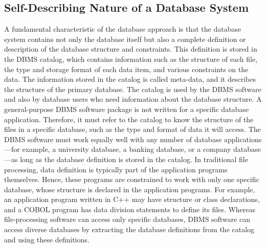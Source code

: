 \subsection{Self-Describing Nature of a Database System}
A fundamental characteristic of the database approach is that the database system contains not only the database itself but also a complete definition or description of the database structure and constraints. This definition is stored in the DBMS catalog, which contains information such as the structure of each file, the type and storage format of each data item, and various constraints on the data. The information stored in the catalog is called meta-data, and it describes the structure of the primary database. The catalog is used by the DBMS software and also by database users who need information about the database structure. A general-purpose DBMS software package is not written for a specific database application. Therefore, it must refer to the catalog to know the structure of the files in a specific database, such as the type and format of data it will access. The DBMS software must work equally well with any number of database applications—for example, a university database, a banking database, or a company database—as long as the database definition is stored in the catalog. In traditional file processing, data definition is typically part of the application programs themselves. Hence, these programs are constrained to work with only one specific database, whose structure is declared in the application programs. For example, an application program written in C++ may have structure or class declarations, and a COBOL program has data division statements to define its files. Whereas file-processing software can access only specific databases, DBMS software can access diverse databases by extracting the database definitions from the catalog and using these definitions.
\thispagestyle{fancy}

